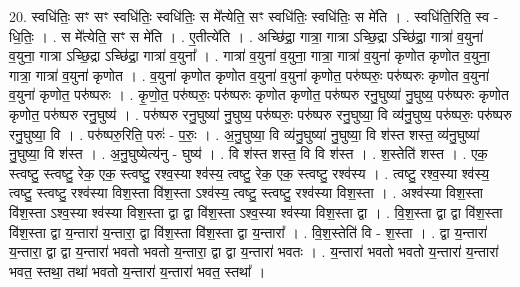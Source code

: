 \documentclass[17pt]{extarticle}
\begin{document}
20. स्वधि॑तिः॒ सꣳ सꣳ स्वधि॑तिः॒ स्वधि॑तिः॒ स मे᳚त्येति॒ सꣳ स्वधि॑तिः॒ स्वधि॑तिः॒ स मे॑ति । . स्वधि॑ति॒रिति॒ स्व - धि॒तिः॒ । . स मे᳚त्येति॒ सꣳ स मे॑ति । . ए॒तीत्ये॑ति । . अच्छि॑द्रा॒ गात्रा॒ गात्रा ऽच्छि॒द्रा ऽच्छि॑द्रा॒ गात्रा॑ व॒युना॑ व॒युना॒ गात्रा ऽच्छि॒द्रा ऽच्छि॑द्रा॒ गात्रा॑ व॒युना᳚ । . गात्रा॑ व॒युना॑ व॒युना॒ गात्रा॒ गात्रा॑ व॒युना॑ कृणोत कृणोत व॒युना॒ गात्रा॒ गात्रा॑ व॒युना॑ कृणोत । . व॒युना॑ कृणोत कृणोत व॒युना॑ व॒युना॑ कृणोत॒ परु॑ष्परुः॒ परु॑ष्परुः कृणोत व॒युना॑ व॒युना॑ कृणोत॒ परु॑ष्परुः । . कृ॒णो॒त॒ परु॑ष्परुः॒ परु॑ष्परुः कृणोत कृणोत॒ परु॑ष्परु रनु॒घुष्या॑ नु॒घुष्य॒ परु॑ष्परुः कृणोत कृणोत॒ परु॑ष्परु रनु॒घुष्य॑ । . परु॑ष्परु रनु॒घुष्या॑ नु॒घुष्य॒ परु॑ष्परुः॒ परु॑ष्परु रनु॒घुष्या॒ वि व्य॑नु॒घुष्य॒ परु॑ष्परुः॒ परु॑ष्परु रनु॒घुष्या॒ वि । . परु॑ष्परु॒रिति॒ परुः॑ - प॒रुः॒ । . अ॒नु॒घुष्या॒ वि व्य॑नु॒घुष्या॑ नु॒घुष्या॒ वि श॑स्त शस्त॒ व्य॑नु॒घुष्या॑ नु॒घुष्या॒ वि श॑स्त । . अ॒नु॒घुष्येत्य॑नु - घुष्य॑ । . वि श॑स्त शस्त॒ वि वि श॑स्त । . श॒स्तेति॑ शस्त । . एक॒ स्त्वष्टु॒ स्त्वष्टु॒ रेक॒ एक॒ स्त्वष्टु॒ रश्व॒स्या श्व॑स्य॒ त्वष्टु॒ रेक॒ एक॒ स्त्वष्टु॒ रश्व॑स्य । . त्वष्टु॒ रश्व॒स्या श्व॑स्य॒ त्वष्टु॒ स्त्वष्टु॒ रश्व॑स्या विश॒स्ता वि॑श॒स्ता ऽश्व॑स्य॒ त्वष्टु॒ स्त्वष्टु॒ रश्व॑स्या विश॒स्ता । . अश्व॑स्या विश॒स्ता वि॑श॒स्ता ऽश्व॒स्या श्व॑स्या विश॒स्ता द्वा द्वा वि॑श॒स्ता ऽश्व॒स्या श्व॑स्या विश॒स्ता द्वा । . वि॒श॒स्ता द्वा द्वा वि॑श॒स्ता वि॑श॒स्ता द्वा य॒न्तारा॑ य॒न्तारा॒ द्वा वि॑श॒स्ता वि॑श॒स्ता द्वा य॒न्तारा᳚ । . वि॒श॒स्तेति॑ वि - श॒स्ता । . द्वा य॒न्तारा॑ य॒न्तारा॒ द्वा द्वा य॒न्तारा॑ भवतो भवतो य॒न्तारा॒ द्वा द्वा य॒न्तारा॑ भवतः । . य॒न्तारा॑ भवतो भवतो य॒न्तारा॑ य॒न्तारा॑ भवत॒ स्तथा॒ तथा॑ भवतो य॒न्तारा॑ य॒न्तारा॑ भवत॒ स्तथा᳚ । \newline
\end{document}
